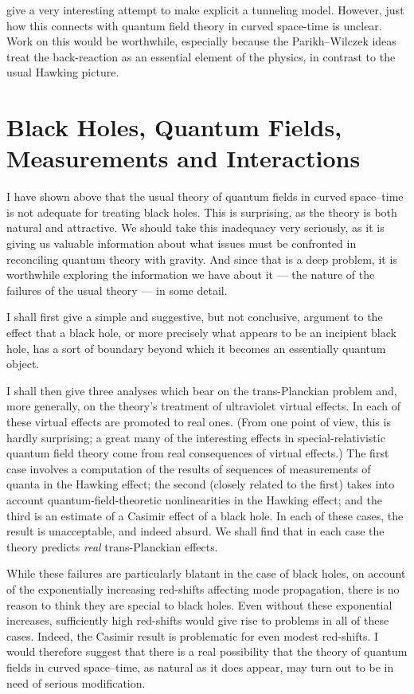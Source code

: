 \documentclass[12pt]{article}
\begin{document}
\citet{Parikh:1999mf} give a very interesting attempt to make explicit a tunneling model.  However, just how this connects with quantum field theory in curved space-time is unclear.  Work on this would be worthwhile, especially because the Parikh--Wilczek ideas treat the back-reaction as an essential element of the physics, in contrast to the usual Hawking picture.


\section{Black Holes, Quantum Fields, \protect\\ Measurements and Interactions}\label{moreqft}

I have shown above that the usual theory of quantum fields in curved space--time is not adequate for treating black holes.  This is surprising, as the theory is both natural and attractive.
We should take this inadequacy very seriously, as it is giving us valuable information about what issues must be confronted in reconciling quantum theory with gravity.  And since that is a deep problem, it is worthwhile exploring the information we have about it --- the nature of the failures of the usual theory --- in some detail.  

I shall first give a simple and suggestive, but not conclusive, argument to the effect that a black hole, or more precisely what appears to be an incipient black hole, has a sort of boundary beyond which it becomes an essentially quantum object. 

I shall then give three analyses which bear on the trans-Planckian problem and, more generally, on the theory's treatment of ultraviolet virtual effects.  In each of these virtual effects are promoted to real ones.  (From one point of view, this is hardly surprising; a great many of the interesting effects in special-relativistic quantum field theory come from real consequences of virtual effects.)  The first case involves a computation of the results of sequences of measurements of quanta in the Hawking effect; the second (closely related to the first) takes into account quantum-field-theoretic nonlinearities in the Hawking effect; and the third is an estimate of a Casimir effect of a black hole.
In each of these cases, the result is unacceptable, and indeed absurd.  We shall find that in each case the theory predicts {\em real} trans-Planckian effects.

While these failures are particularly blatant in the case of black holes, on account of the exponentially increasing red-shifts affecting mode propagation, there is no reason to think they are special to black holes.  Even without these exponential increases, sufficiently high red-shifts would give rise to problems in all of these cases.  Indeed, the Casimir result is problematic for even modest red-shifts.
I would therefore suggest that there is a real possibility that the theory of quantum fields in curved space--time, as natural as it does appear, may turn out to be in need of serious modification.  
\end{document}
